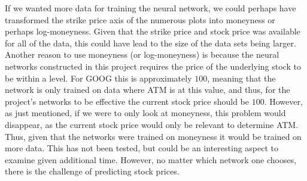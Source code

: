 If we wanted more data for training the neural network, we could perhaps have transformed the strike price axis of the numerous plots into moneyness or perhaps log-moneyness. Given that the strike price and stock price was available for all of the data, this could have lead to the size of the data sets being larger. Another reason to use moneyness (or log-moneyness) is because the neural networks constructed in this project requires the price of the underlying stock to be within a level. For GOOG this is approximately $100$, meaning that the network is only trained on data where ATM is at this value, and thus, for the project's networks to be effective the current stock price should be $100$. However, as just mentioned, if we were to only look at moneyness, this problem would disappear, as the current stock price would only be relevant to determine ATM. Thus, given that the networks were trained on moneyness it would be trained on more data. This has not been tested, but could be an interesting aspect to examine given additional time. However, no matter which network one chooses, there is the challenge of predicting stock prices. 

